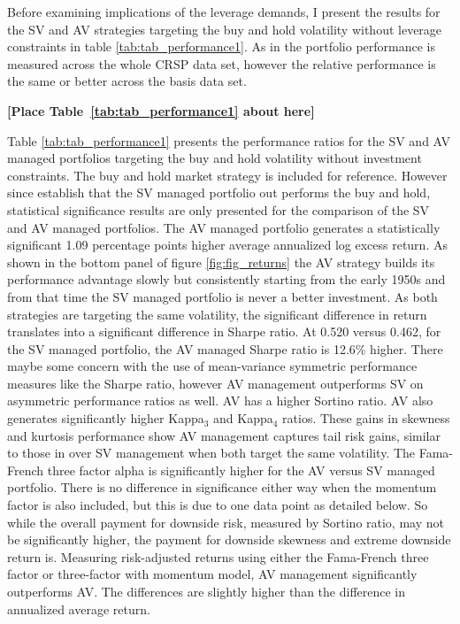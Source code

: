 Before examining implications of the leverage demands, I present the results for the SV and AV strategies targeting the buy and hold volatility without leverage constraints in table \ref{tab:tab_performance1}. As in \citet{moreira_volatility-managed_2017} the portfolio performance is measured across the whole CRSP data set, however the relative performance is the same or better across the basis data set. 

\bigskip
\centerline{\bf [Place Table~\ref{tab:tab_performance1} about here]}
\bigskip

Table \ref{tab:tab_performance1} presents the performance ratios for the SV and AV managed portfolios targeting the buy and hold volatility without investment constraints. The buy and hold market strategy is included for reference. However since \citet{moreira_volatility-managed_2017} establish that the SV managed portfolio out performs the buy and hold, statistical significance results are only presented for the comparison of the SV and AV managed portfolios. The AV managed portfolio generates a statistically significant 1.09 percentage points higher average annualized log excess return. As shown in the bottom panel of figure \ref{fig:fig_returns} the AV strategy builds its performance advantage slowly but consistently starting from the early 1950s and from that time the SV managed portfolio is never a better investment. As both strategies are targeting the same volatility, the significant difference in return translates into a significant difference in Sharpe ratio. At 0.520 versus 0.462, for the SV managed portfolio, the AV managed Sharpe ratio is 12.6\% higher. There maybe some concern with the use of mean-variance symmetric performance measures like the Sharpe ratio, however AV management outperforms SV on asymmetric performance ratios as well. AV has a higher Sortino ratio. AV also generates significantly higher Kappa$_{3}$ and Kappa$_{4}$ ratios.  These gains in skewness and kurtosis performance show AV management captures tail risk gains, similar to those in \citet{hocquard_constant-volatility_2013} over SV management when both target the same volatility. The Fama-French three factor alpha is significantly higher for the AV versus SV managed portfolio. There is no difference in significance either way when the momentum factor is also included, but this is due to one data point as detailed below. So while the overall payment for downside risk, measured by Sortino ratio, may not be significantly higher, the payment for downside skewness and extreme downside return is. Measuring risk-adjusted returns using either the Fama-French three factor or three-factor with momentum model, AV management significantly outperforms AV. The differences are slightly higher than the difference in annualized average return.%